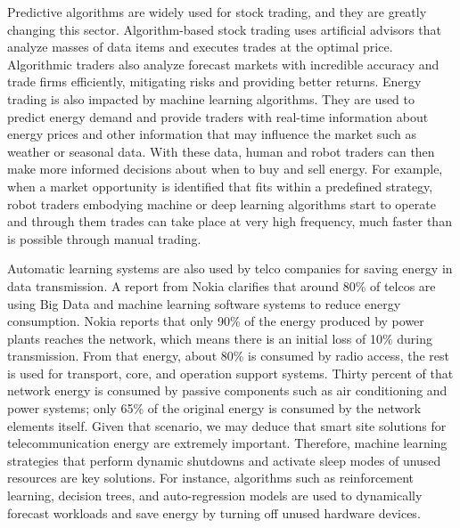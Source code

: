 Predictive algorithms are widely used for stock trading, and they are greatly changing this sector. Algorithm-based stock trading uses artificial advisors that analyze masses of data items and executes trades at the optimal price. Algorithmic traders also analyze forecast markets with incredible accuracy and trade firms efficiently, mitigating risks and providing better returns. Energy trading is also impacted by machine learning algorithms. They are used to predict energy demand and provide traders with real-time information about energy prices and other information that may influence the market such as weather or seasonal data. With these data, human and robot traders can then make more informed decisions about when to buy and sell energy. For example, when a market opportunity is identified that fits within a predefined strategy, robot traders embodying machine or deep learning algorithms start to operate and through them trades can take place at very high frequency, much faster than is possible through manual trading.

Automatic learning systems are also used by telco companies for saving energy in data transmission. A report from Nokia clarifies that around 80\% of telcos are using Big Data and machine learning software systems to reduce energy consumption. Nokia reports that only 90\% of the energy produced by power plants reaches the network, which means there is an initial loss of 10\% during transmission. From that energy, about 80\% is consumed by radio access, the rest is used for transport, core, and operation support systems. Thirty percent of that network energy is consumed by passive components such as air conditioning and power systems; only 65\% of the original energy is consumed by the network elements itself. Given that scenario, we may deduce that smart site solutions for telecommunication energy are extremely important. Therefore, machine learning strategies that perform dynamic shutdowns and activate sleep modes of unused resources are key solutions. For instance, algorithms such as reinforcement learning, decision trees, and auto-regression models are used to dynamically forecast workloads and save energy by turning off unused hardware devices.

